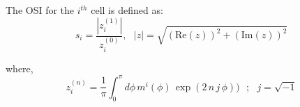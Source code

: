 \newcommand{\mZero}{m_E^{(0)}}
\newcommand{\mOne}{m_E^{(1)}}
\newcommand{\zZero}{z^{(0)}}
\newcommand{\zOne}{z^{(1)}}

The OSI for the $i^{th}$ cell is defined as: 
\begin{equation}
s_{i} = \frac{| \zOne_i |}{ \zZero_i}, \,\,\,\, |z| = \sqrt{(\mathrm{Re}(z))^2 + (\mathrm{Im}(z))^2}
\label{defosi}
\end{equation}

where,\\
\begin{equation}
z_i^{(n)} = \frac{1}{\pi} \int_0^{\pi} d \phi \,  m^i(\phi) \, \exp (2 \, n \,  j \, \phi)) \,\,\,\,; \,\,\,\, j = \sqrt{-1}
\end{equation}


